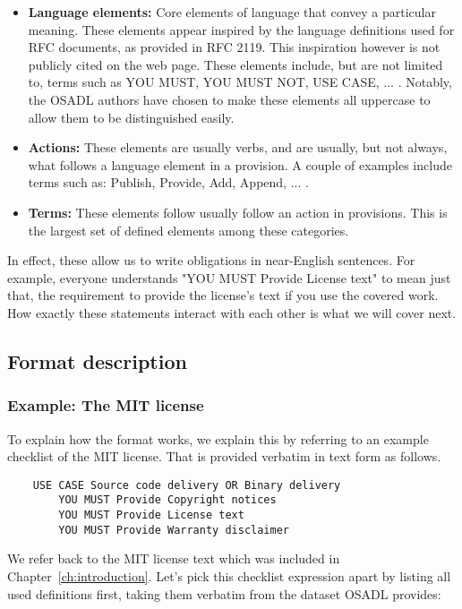 \begin{itemize}
	\item \textbf{Language elements:} Core elements of language that convey a particular meaning. These elements appear inspired by the language definitions used for RFC documents, as provided in RFC 2119. This inspiration however is not publicly cited on the web page. These elements include, but are not limited to, terms such as YOU MUST, YOU MUST NOT, USE CASE, ... . Notably, the OSADL authors have chosen to make these elements all uppercase to allow them to be distinguished easily.
	\item \textbf{Actions:} These elements are usually verbs, and are usually, but not always, what follows a language element in a provision. A couple of examples include terms such as: Publish, Provide, Add, Append, ... .
	\item \textbf{Terms:} These elements follow usually follow an action in provisions. This is the largest set of defined elements among these categories.
\end{itemize}

In effect, these allow us to write obligations in near-English sentences. For example, everyone understands "YOU MUST Provide License text" to mean just that, the requirement to provide the license's text if you use the covered work. How exactly these statements interact with each other is what we will cover next.

\subsection{Format description}

\subsubsection{Example: The MIT license}

To explain how the format works, we explain this by referring to an example checklist of the MIT license. That is provided verbatim in text form as follows.

\begin{verbatim}
	USE CASE Source code delivery OR Binary delivery
		YOU MUST Provide Copyright notices
		YOU MUST Provide License text
		YOU MUST Provide Warranty disclaimer
\end{verbatim}

We refer back to the MIT license text which was included in Chapter~\ref{ch:introduction}. Let's pick this checklist expression apart by listing all used definitions first, taking them verbatim from the dataset OSADL provides:


